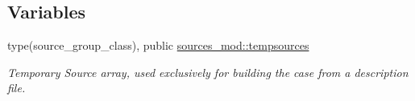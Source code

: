 \subsection*{Variables}
\begin{DoxyCompactItemize}
\item 
type(source\+\_\+group\+\_\+class), public \mbox{\hyperlink{namespacesources__mod_ab04ea8c02cdf83a1a356c8710ae811d5}{sources\+\_\+mod\+::tempsources}}
\begin{DoxyCompactList}\small\item\em Temporary Source array, used exclusively for building the case from a description file. \end{DoxyCompactList}\end{DoxyCompactItemize}
